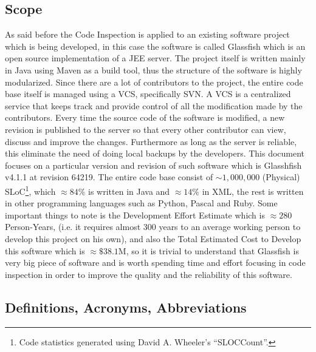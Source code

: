 \subsection{Scope}
As said before the Code Inspection is applied to an existing software project which is being developed, in this case the software is called Glassfish which is an open source implementation of a JEE server.
The project itself is written mainly in Java using Maven as a build tool, thus the structure of the software is highly modularized. \newline
Since there are a lot of contributors to the project, the entire code base itself is managed using a VCS, specifically SVN. A VCS is a centralized service that keeps track and provide control of all the modification made by the contributors. Every time the source code of the software is modified, a new revision is published to the server so that every other contributor can view, discuss and improve the changes.
Furthermore as long as the server is reliable, this eliminate the need of doing local backups by the developers.\newline
This document focuses on a particular version and revision of such software which is Glasshfish v4.1.1 at revision 64219.
The entire code base consist of $\sim 1,000,000$ (Physical) SLoC\footnote{Code statistics generated using David A. Wheeler's ``SLOCCount''.}, which $\approx 84\%$ is written in Java and $\approx14\%$ in XML, the rest is written in other programming languages such as Python, Pascal and Ruby. Some important things to note is the Development Effort Estimate which is $\approx 280$ Person-Years, (i.e. it requires almost 300 years to an average working person to develop this project on his own), and also the Total Estimated Cost to Develop this software which is $\approx \$38.1$M, so it is trivial to understand that Glassfish is very big piece of software and is worth spending time and effort focusing in code inspection in order to improve the quality and the reliability of this software. 
\subsection{Definitions, Acronyms, Abbreviations}
